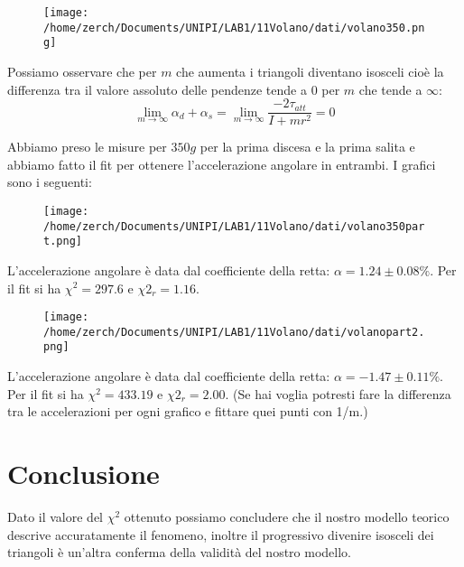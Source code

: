 \documentclass[a4paper,10pt]{article}
\begin{document}
\begin {figure}[!htb]
\begin{center}
\texttt{[image: /home/zerch/Documents/UNIPI/LAB1/11Volano/dati/volano350.png]}
\end{center}
\end{figure}

Possiamo osservare che per $m$ che aumenta i triangoli diventano isosceli cioè la differenza tra il valore assoluto delle pendenze tende a 0 per $m$ che tende a $\infty$:
\begin{equation}
 \lim_{m\to \infty }\alpha_d+\alpha_s= \lim_{m\to \infty }\frac{-2\tau_{att}}{I+mr^2}=0
\end{equation}

Abbiamo preso le misure per $350g$ per la prima discesa e la prima salita e abbiamo fatto il fit per ottenere l'accelerazione angolare in entrambi. I grafici sono i seguenti:
\pagebreak

\begin {figure}[!htb]
\begin{center}
\texttt{[image: /home/zerch/Documents/UNIPI/LAB1/11Volano/dati/volano350part.png]}
\end{center}
\end{figure}
L'accelerazione angolare è data dal coefficiente della retta: $\alpha=1.24\pm0.08\%$. Per il fit si ha $\chi^2=297.6$ e $\chi2_r=1.16$.

\begin {figure}[!htb]
\begin{center}
\texttt{[image: /home/zerch/Documents/UNIPI/LAB1/11Volano/dati/volanopart2.png]}
\end{center}
\end{figure}
L'accelerazione angolare è data dal coefficiente della retta: $\alpha=-1.47\pm0.11\%$. Per il fit si ha $\chi^2=433.19$ e $\chi2_r=2.00$.
(Se hai voglia potresti fare la differenza tra le accelerazioni per ogni grafico e fittare quei punti con 1/m.)

\pagebreak
\section{Conclusione}
Dato il valore del $\chi^2$ ottenuto possiamo concludere che il nostro modello teorico descrive accuratamente il fenomeno, inoltre il progressivo divenire isosceli dei triangoli è un'altra conferma della validità del nostro modello.
\end{document}
